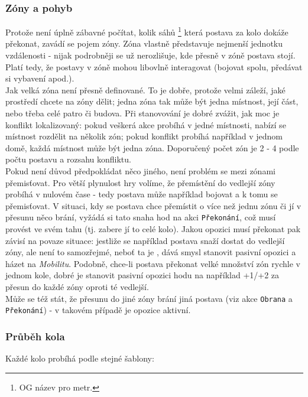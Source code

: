 \subsubsection{Zóny a pohyb}
\label{sec:zónyapohyb}

Protože není úplně zábavné počítat, kolik sáhů \footnote{OG název pro metr.} která postava za kolo dokáže překonat, zavádí se pojem zóny. Zóna vlastně představuje nejmenší jednotku vzdálenosti - nijak podrobněji se už nerozlišuje, kde přesně v zóně postava stojí. Platí tedy, že postavy v zóně mohou libovlně interagovat (bojovat spolu, předávat si vybavení apod.).\\
Jak velká zóna není přesně definované. To je dobře, protože velmi záleží, jaké prostředí chcete na zóny dělit; jedna zóna tak může být jedna místnost, její část, nebo třeba celé patro či budova. Při stanovování je dobré zvážit, jak moc je konflikt lokalizovaný: pokud veškerá akce probíhá v jedné místnosti, nabízí se místnost rozdělit na několik zón; pokud konflikt probíhá například v jednom domě, každá místnost může být jedna zóna. Doporučený počet zón je 2 - 4 podle počtu postavu a rozsahu konfliktu.\\
Pokud není důvod předpokládat něco jiného, není problém se mezi zónami přemisťovat. Pro větší plynulost hry volíme, že přemístění do vedlejší zóny probíhá v nulovém čase - tedy postava může například bojovat a k tomu se přemisťovat. V situaci, kdy se postava chce přemístit o více než jednu zónu či jí v přesunu něco brání, vyžádá si tato snaha hod na akci \texttt{Překonání}, což musí provést ve svém tahu (tj. zabere jí to celé kolo). Jakou opozici musí překonat pak závisí na povaze situace: jestliže se například postava snaží dostat do vedlejší zóny, ale není to samozřejmé, neboť ta je , dává smysl stanovit pasivní opozici a házet na \textit{Mobilitu}. Podobně, chce-li postava překonat velké množství zón rychle v jednom kole, dobré je stanovit pasivní opozici hodu na například +1/+2 za přesun do každé zóny oproti té vedlejší.\\
Může se též stát, že přesunu do jiné zóny brání jiná postava (viz akce \texttt{Obrana} a \texttt{Překonání}) - v takovém případě je opozice aktivní.

\subsubsection{Průběh kola}
\label{sec:prubehkola}

Každé kolo probíhá podle stejné šablony:

